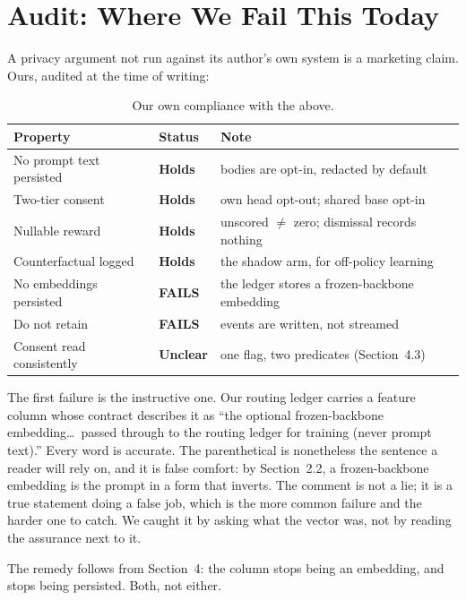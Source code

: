 \documentclass[11pt,a4paper]{article}
\begin{document}
\section{Audit: Where We Fail This Today}

A privacy argument not run against its author's own system is a marketing claim. Ours,
audited at the time of writing:

\begin{table}[H]
\centering
\caption{Our own compliance with the above.}
\begin{tabular}{lll}
\toprule
\textbf{Property} & \textbf{Status} & \textbf{Note} \\
\midrule
No prompt text persisted    & \textbf{Holds}  & bodies are opt-in, redacted by default \\
Two-tier consent            & \textbf{Holds}  & own head opt-out; shared base opt-in \\
Nullable reward             & \textbf{Holds}  & unscored $\neq$ zero; dismissal records nothing \\
Counterfactual logged       & \textbf{Holds}  & the shadow arm, for off-policy learning \\
No embeddings persisted     & \textbf{FAILS}  & the ledger stores a frozen-backbone embedding \\
Do not retain               & \textbf{FAILS}  & events are written, not streamed \\
Consent read consistently   & \textbf{Unclear} & one flag, two predicates (Section~4.3) \\
\bottomrule
\end{tabular}
\end{table}

The first failure is the instructive one. Our routing ledger carries a feature column whose
contract describes it as ``the optional frozen-backbone embedding\dots\ passed through to
the routing ledger for training (never prompt text).'' Every word is accurate. The
parenthetical is nonetheless the sentence a reader will rely on, and it is false comfort:
by Section~2.2, a frozen-backbone embedding is the prompt in a form that inverts. The
comment is not a lie; it is a true statement doing a false job, which is the more common
failure and the harder one to catch. We caught it by asking what the vector was, not by
reading the assurance next to it.

The remedy follows from Section~4: the column stops being an embedding, and stops being
persisted. Both, not either.
\end{document}
